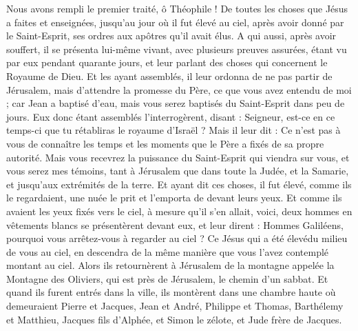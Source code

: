 \begin{multicols}{2}

\VerseOne{}Nous avons rempli le premier traité, ô Théophile ! De toutes les choses que Jésus a faites et enseignées, 
jusqu'au jour où il fut élevé au ciel, après avoir donné par le Saint-Esprit, ses ordres aux apôtres qu'il avait élus.
A qui aussi, après avoir souffert, il se présenta lui-même vivant, avec plusieurs preuves assurées, étant vu par eux pendant quarante jours, et leur parlant des choses qui concernent le Royaume de Dieu.
Et les ayant assemblés, il leur ordonna de ne pas partir de Jérusalem, mais d'attendre la promesse du Père, ce que vous avez entendu de moi ;
car Jean a baptisé d'eau, mais vous serez baptisés du Saint-Esprit dans peu de jours.
Eux donc étant assemblés l'interrogèrent, disant : Seigneur, est-ce en ce temps-ci que tu rétabliras le royaume d'Israël ?
Mais il leur dit : Ce n'est pas à vous de connaître les temps et les moments que le Père a fixés de sa propre autorité.
Mais vous recevrez la puissance du Saint-Esprit qui viendra sur vous, et vous serez mes témoins, tant à Jérusalem que dans toute la Judée, et la Samarie, et jusqu'aux extrémités de la terre.
Et ayant dit ces choses, il fut élevé, comme ils le regardaient, une nuée le prit et l'emporta de devant leurs yeux.
Et comme ils avaient les yeux fixés vers le ciel, à mesure qu'il s'en allait, voici, deux hommes en vêtements blancs se présentèrent devant eux,
et leur dirent : Hommes Galiléens, pourquoi vous arrêtez-vous à regarder au ciel ? Ce Jésus qui a été élevédu milieu de vous au ciel, en descendra de la même manière que vous l'avez contemplé montant au ciel.
Alors ils retournèrent à Jérusalem de la montagne appelée la Montagne des Oliviers, qui est près de Jérusalem, le chemin d'un sabbat.
Et quand ils furent entrés dans la ville, ils montèrent dans une chambre haute où demeuraient Pierre et Jacques, Jean et André, Philippe et Thomas, Barthélemy et Matthieu, Jacques fils d'Alphée, et Simon le zélote, et Jude frère de Jacques.

\end{multicols}
